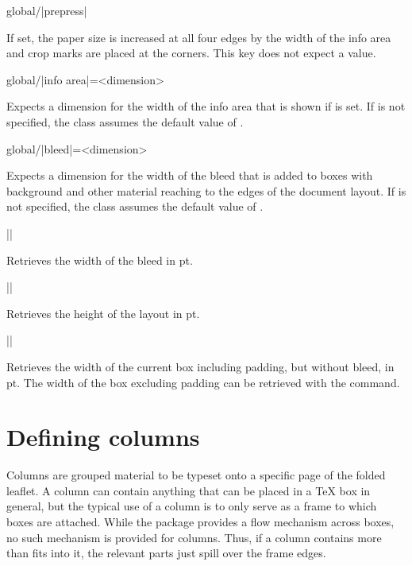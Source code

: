 \documentclass[a4paper]{article}
\begin{document}
\begin{macrodef}
global/|prepress|
\end{macrodef}
If set, the paper size is increased at all four edges by the width of the info area and crop marks are placed at the corners. This key does not expect a value.

\begin{macrodef}
global/|info area|={<dimension>}
\end{macrodef}
Expects a dimension for the width of the info area that is shown if  is set. If  is not specified, the class assumes the default value of \macro{10mm}.

\begin{macrodef}
global/|bleed|={<dimension>}
\end{macrodef}
Expects a dimension for the width of the bleed that is added to boxes with background and other material reaching to the edges of the document layout. If  is not specified, the class assumes the default value of \macro{3mm}.

\begin{macrodef}
|\leporellobleed|
\end{macrodef}
Retrieves the width of the bleed in pt.

\begin{macrodef}
|\leporellolayoutheight|
\end{macrodef}
Retrieves the height of the layout in pt.

\begin{macrodef}
|\leporelloboxwidth|
\end{macrodef}
Retrieves the width of the current box including padding, but without bleed, in pt. The width of the box excluding padding can be retrieved with the \macro{\linewidth} command.

\section{Defining columns}

Columns are grouped material to be typeset onto a specific page of the folded leaflet. A column can contain anything that can be placed in a TeX box in general, but the typical use of a column is to only serve as a frame to which boxes are attached. While the package provides a flow mechanism across boxes, no such mechanism is provided for columns. Thus, if a column contains more than fits into it, the relevant parts just spill over the frame edges.
\end{document}
